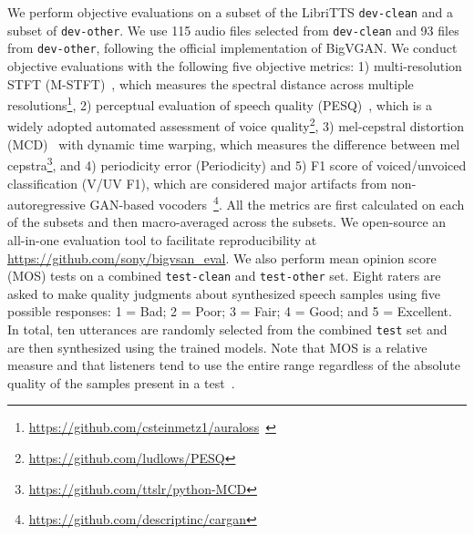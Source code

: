\documentclass{article}
\begin{document}
We perform objective evaluations on a subset of the LibriTTS \texttt{dev-clean} and a subset of \texttt{dev-other}. We use 115 audio files selected from \texttt{dev-clean} and 93 files from \texttt{dev-other}, following the official implementation of BigVGAN. We conduct objective evaluations with the following five objective metrics: 1) multi-resolution STFT (M-STFT)~\cite{yamamoto2020parallel}, which measures the spectral distance across multiple resolutions\footnote{\url{https://github.com/csteinmetz1/auraloss}~\cite{steinmetz2020auraloss}}, 2) perceptual evaluation of speech quality (PESQ)~\cite{rix2001pesq}, which is a widely adopted automated assessment of voice quality\footnote{\url{https://github.com/ludlows/PESQ}}, 3) mel-cepstral distortion (MCD)~\cite{kubichek1993mel} with dynamic time warping, which measures the difference between mel cepstra\footnote{\url{https://github.com/ttslr/python-MCD}}, and 4) periodicity error (Periodicity) and 5) F1 score of voiced/unvoiced classification (V/UV F1), which are considered major artifacts from non-autoregressive GAN-based vocoders~\cite{morrison2022chunked}\footnote{\url{https://github.com/descriptinc/cargan}}. All the metrics are first calculated on each of the subsets and then macro-averaged across the subsets. We open-source an all-in-one evaluation tool to facilitate reproducibility at \url{https://github.com/sony/bigvsan_eval}. 
We also perform mean opinion score (MOS) tests on a combined \texttt{test-clean} and \texttt{test-other} set. Eight raters are asked to make quality judgments about synthesized speech samples using five possible responses: 1 = Bad; 2 = Poor; 3 = Fair; 4 = Good; and 5 = Excellent. In total, ten utterances are randomly selected from the combined \texttt{test} set and are then synthesized using the trained models. Note that MOS is a relative measure and that listeners tend to use the entire range regardless of the absolute quality of the samples present in a
test~\cite{cooper23investigating}.
\end{document}
